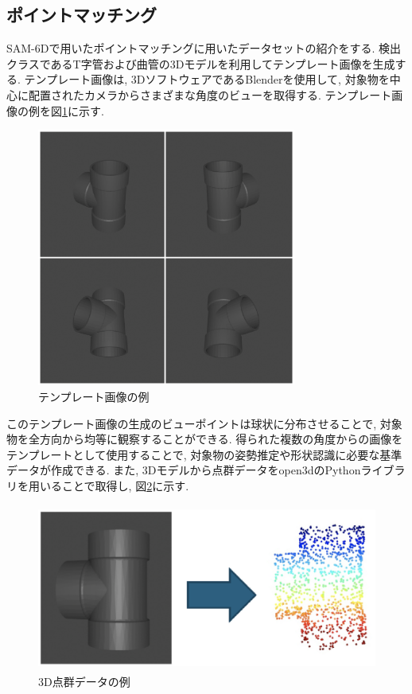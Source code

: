 \subsection{ポイントマッチング}
SAM-6Dで用いたポイントマッチングに用いたデータセットの紹介をする. 
検出クラスであるT字管および曲管の3Dモデルを利用してテンプレート画像を生成する. 
テンプレート画像は, 3DソフトウェアであるBlenderを使用して, 対象物を中心に配置されたカメラからさまざまな角度のビューを取得する. 
テンプレート画像の例を図\ref{fig:4-f5}に示す. 
\begin{figure}[htbt]
  \centering
   \includegraphics[height=85mm]{Figure/template.eps}
   \caption{テンプレート画像の例}
   \label{fig:4-f5}
\end{figure}

このテンプレート画像の生成のビューポイントは球状に分布させることで, 対象物を全方向から均等に観察することができる. 
得られた複数の角度からの画像をテンプレートとして使用することで, 対象物の姿勢推定や形状認識に必要な基準データが作成できる. 
また, 3Dモデルから点群データをopen3dのPythonライブラリを用いることで取得し, 図\ref{fig:4-f6}に示す. 
\begin{figure}[htbt]
  \centering
   \includegraphics[height=55mm]{Figure/point_cloud.eps}
   \caption{3D点群データの例}
   \label{fig:4-f6}
\end{figure}

